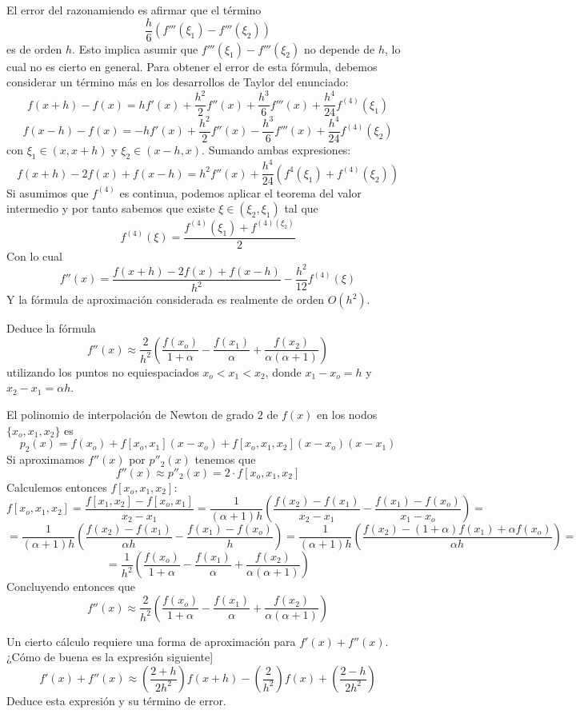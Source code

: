 \begin{sol}
El error del razonamiendo es afirmar que el término
$$\dfrac{h}{6}(f'''(\xi_1)-f'''(\xi_2))$$
es de orden $h$. Esto implica asumir que $f'''(\xi_1)-f'''(\xi_2)$ no depende de $h$, lo cual no es cierto en general. Para obtener el error de esta fórmula, debemos considerar un término más en los desarrollos de Taylor del enunciado:
$$f(x+h)-f(x)=hf'(x)+\dfrac{h^2}{2}f''(x)+\dfrac{h^3}{6}f'''(x)+\dfrac{h^4}{24}f^{(4)}(\xi_1)$$
$$f(x-h)-f(x)=-hf'(x)+\dfrac{h^2}{2}f''(x)-\dfrac{h^3}{6}f'''(x)+\dfrac{h^4}{24}f^{(4)}(\xi_2)$$
con $\xi_1\in(x,x+h)$ y $\xi_2\in(x-h,x)$. Sumando ambas expresiones:
$$f(x+h)-2f(x)+f(x-h)=h^2f''(x)+\dfrac{h^4}{24}(f^{4}(\xi_1)+f^{(4)}(\xi_2))$$
Si asumimos que $f^{(4)}$ es continua, podemos aplicar el teorema del valor intermedio y por tanto sabemos que existe $\xi\in(\xi_2,\xi_1)$ tal que
$$f^{(4)}(\xi)=\dfrac{f^{(4)}(\xi_1)+f^{(4)(\xi_2)}}{2}$$
Con lo cual
$$f''(x)=\dfrac{f(x+h)-2f(x)+f(x-h)}{h^2}-\dfrac{h^2}{12}f^{(4)}(\xi)$$
Y la fórmula de aproximación considerada es realmente de orden $O(h^2)$.
\end{sol}
\begin{ejer}
Deduce la fórmula
$$f''(x)\approx \dfrac{2}{h^2}\left(\dfrac{f(x_o)}{1+\alpha}-\dfrac{f(x_1)}{\alpha}+\dfrac{f(x_2)}{\alpha(\alpha+1)}\right)$$
utilizando los puntos no equiespaciados $x_o<x_1<x_2$, donde $x_1-x_o=h$ y $x_2-x_1=\alpha h$.
\end{ejer}
\begin{sol}
El polinomio de interpolación de Newton de grado $2$ de $f(x)$ en los nodos $\{x_o,x_1,x_2\}$ es 
$$p_2(x)=f(x_o)+f[x_o,x_1](x-x_o)+f[x_o,x_1,x_2](x-x_o)(x-x_1)$$
Si aproximamos $f''(x)$ por $p''_2(x)$ tenemos que
$$f''(x)\approx p''_2(x)=2\cdot f[x_o,x_1,x_2]$$
Calculemos entonces $f[x_o,x_1,x_2]$:
$$f[x_o,x_1,x_2]=\dfrac{f[x_1,x_2]-f[x_o,x_1]}{x_2-x_1}=\dfrac{1}{(\alpha+1)h}\left(\dfrac{f(x_2)-f(x_1)}{x_2-x_1}-\dfrac{f(x_1)-f(x_o)}{x_1-x_o}\right)=$$
$$=\dfrac{1}{(\alpha+1)h}\left(\dfrac{f(x_2)-f(x_1)}{\alpha h}-\dfrac{f(x_1)-f(x_o)}{h}\right)=\dfrac{1}{(\alpha+1)h}\left(\dfrac{f(x_2)-(1+\alpha)f(x_1)+\alpha f(x_o)}{\alpha h}\right)=$$
$$=\dfrac{1}{h^2}\left(\dfrac{f(x_o)}{1+\alpha}-\dfrac{f(x_1)}{\alpha}+\dfrac{f(x_2)}{\alpha(\alpha+1)}\right)$$
Concluyendo entonces que
$$f''(x)\approx \dfrac{2}{h^2}\left(\dfrac{f(x_o)}{1+\alpha}-\dfrac{f(x_1)}{\alpha}+\dfrac{f(x_2)}{\alpha(\alpha+1)}\right)$$
\end{sol}
\begin{ejer}
Un cierto cálculo requiere una forma de aproximación para $f'(x)+f''(x)$. ¿Cómo de buena es la expresión siguiente]
$$f'(x)+f''(x)\approx \left(\dfrac{2+h}{2h^2}\right)f(x+h)-\left(\dfrac{2}{h^2}\right)f(x)+\left(\dfrac{2-h}{2h^2}\right)$$
Deduce esta expresión y su término de error.
\end{ejer}
